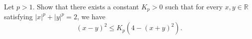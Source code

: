 \documentclass{article}
\begin{document}
	\setlength{\parindent}{0pt}
	Let $p>1$. Show that there exists a constant $K_p>0$ such that for every $x,y\in\mathbb{R}$ satisfying $\lvert x\rvert^p+\lvert y\rvert^p=2$, we have
	$$(x-y)^2\leq K_p\left(4-(x+y)^2\right).$$
\end{document}
